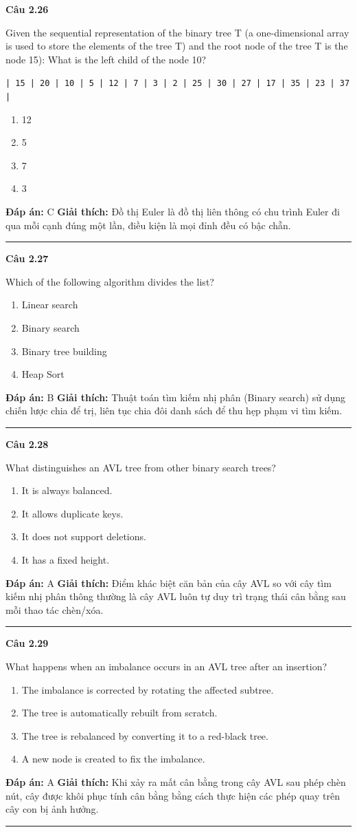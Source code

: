\documentclass[11pt,a4paper]{article}
\newenvironment{question}[1]{%
  \par\vspace{1em}\noindent\textbf{\large Câu #1}\par\vspace{0.4em}
}{%
  \par\vspace{1em}\hrule\vspace{0.6em}
}
\newenvironment{choices}{%
  \begin{enumerate}[label=\textbf{\Alph*.},leftmargin=2.2em,itemsep=2pt,topsep=3pt]
}{%
  \end{enumerate}
}
\newcommand{\choice}{\item}
\begin{document}
\begin{question}{2.26}
Given the sequential representation of the binary tree T (a one-dimensional array is used to store the elements of the tree T) and the root node of the tree T is the node 15): What is the left child of the node 10?

\begin{center}
\texttt{| 15 | 20 | 10 | 5 | 12 | 7 | 3 | 2 | 25 | 30 | 27 | 17 | 35 | 23 | 37 |}
\end{center}
\begin{choices}
\choice 12
\choice 5
\choice 7
\choice 3
\end{choices}
\textbf{Đáp án:} C
\textbf{Giải thích:} Đồ thị Euler là đồ thị liên thông có chu trình Euler đi qua mỗi cạnh đúng một lần, điều kiện là mọi đỉnh đều có bậc chẵn.
\end{question}

\begin{question}{2.27}
Which of the following algorithm divides the list?
\begin{choices}
\choice Linear search
\choice Binary search
\choice Binary tree building
\choice Heap Sort
\end{choices}
\textbf{Đáp án:} B
\textbf{Giải thích:} Thuật toán tìm kiếm nhị phân (Binary search) sử dụng chiến lược chia để trị, liên tục chia đôi danh sách để thu hẹp phạm vi tìm kiếm.
\end{question}

\begin{question}{2.28}
What distinguishes an AVL tree from other binary search trees?
\begin{choices}
\choice It is always balanced.
\choice It allows duplicate keys.
\choice It does not support deletions.
\choice It has a fixed height.
\end{choices}
\textbf{Đáp án:} A
\textbf{Giải thích:} Điểm khác biệt căn bản của cây AVL so với cây tìm kiếm nhị phân thông thường là cây AVL luôn tự duy trì trạng thái cân bằng sau mỗi thao tác chèn/xóa.
\end{question}

\begin{question}{2.29}
What happens when an imbalance occurs in an AVL tree after an insertion?
\begin{choices}
\choice The imbalance is corrected by rotating the affected subtree.
\choice The tree is automatically rebuilt from scratch.
\choice The tree is rebalanced by converting it to a red-black tree.
\choice A new node is created to fix the imbalance.
\end{choices}
\textbf{Đáp án:} A
\textbf{Giải thích:} Khi xảy ra mất cân bằng trong cây AVL sau phép chèn nút, cây được khôi phục tính cân bằng bằng cách thực hiện các phép quay trên cây con bị ảnh hưởng.
\end{question}
\end{document}
